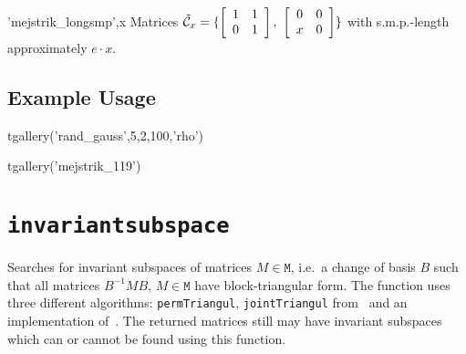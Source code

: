\begin{param}

\item['mejstrik\_longsmp',x] Matrices $\tilde{\mathcal{C}}_x=\{ 
\left[\begin{array}{c c}1 & 1\\0& 1\end{array}\right],\  
\left[\begin{array}{c c}0 & 0\\x& 0\end{array}\right]
\}$ with s.m.p.-length approximately $e\cdot x$.

\end{param}

\subsection*{Example Usage}
\begin{param}
\item[{tgallery('rand\_gauss',5,2,100,'rho')}]
\item[{tgallery('mejstrik\_119')}]
\end{param}


\section{\texttt{invariantsubspace}}\label{invariantsubspace}
Searches for invariant subspaces of matrices $M\in\texttt{M}$, 
i.e.\ a change of basis $B$ such that all matrices $B^{-1}MB$, $M\in\texttt{M}$ have block-triangular form.
The function uses three different algorithms: \texttt{permTriangul}, \texttt{jointTriangul} from~\cite{Jung2014} and an implementation of~\cite{CP17}.
The returned matrices still may have invariant subspaces which can or cannot be found using this function.
